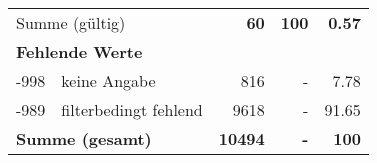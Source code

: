\begin{longtable}{lXrrr}
     \midrule
     \multicolumn{2}{l}{Summe (gültig)} &
       \textbf{\num{60}} &
     \textbf{100} &
       \textbf{\num[round-mode=places,round-precision=2]{0,57}} \\
     \multicolumn{5}{l}{\textbf{Fehlende Werte}}\\
       -998 &
       keine Angabe &
         \num{816} &
        - &
         \num[round-mode=places,round-precision=2]{7,78} \\
       -989 &
       filterbedingt fehlend &
         \num{9618} &
        - &
         \num[round-mode=places,round-precision=2]{91,65} \\
     \midrule
     \multicolumn{2}{l}{\textbf{Summe (gesamt)}} &
          \textbf{\num{10494}} &
        \textbf{-} &
        \textbf{100} \\
     \bottomrule
     \end{longtable}
     
